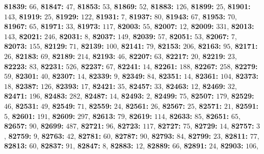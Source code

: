\textsf{\bfseries 81839:} $66$, \textsf{\bfseries 81847:} $47$, \textsf{\bfseries 81853:} $53$, \textsf{\bfseries 81869:} $52$, \textsf{\bfseries 81883:} $126$, \textsf{\bfseries 81899:} $25$, \textsf{\bfseries 81901:} $143$, \textsf{\bfseries 81919:} $25$, \textsf{\bfseries 81929:} $122$, \textsf{\bfseries 81931:} $7$, \textsf{\bfseries 81937:} $80$, \textsf{\bfseries 81943:} $67$, \textsf{\bfseries 81953:} $70$, \textsf{\bfseries 81967:} $65$, \textsf{\bfseries 81971:} $33$, \textsf{\bfseries 81973:} $117$, \textsf{\bfseries 82003:} $55$, \textsf{\bfseries 82007:} $12$, \textsf{\bfseries 82009:} $331$, \textsf{\bfseries 82013:} $143$, \textsf{\bfseries 82021:} $246$, \textsf{\bfseries 82031:} $8$, \textsf{\bfseries 82037:} $149$, \textsf{\bfseries 82039:} $57$, \textsf{\bfseries 82051:} $53$, \textsf{\bfseries 82067:} $7$, \textsf{\bfseries 82073:} $155$, \textsf{\bfseries 82129:} $71$, \textsf{\bfseries 82139:} $100$, \textsf{\bfseries 82141:} $79$, \textsf{\bfseries 82153:} $206$, \textsf{\bfseries 82163:} $95$, \textsf{\bfseries 82171:} $26$, \textsf{\bfseries 82183:} $69$, \textsf{\bfseries 82189:} $214$, \textsf{\bfseries 82193:} $46$, \textsf{\bfseries 82207:} $63$, \textsf{\bfseries 82217:} $20$, \textsf{\bfseries 82219:} $23$, \textsf{\bfseries 82223:} $83$, \textsf{\bfseries 82231:} $526$, \textsf{\bfseries 82237:} $67$, \textsf{\bfseries 82241:} $14$, \textsf{\bfseries 82261:} $188$, \textsf{\bfseries 82267:} $258$, \textsf{\bfseries 82279:} $59$, \textsf{\bfseries 82301:} $40$, \textsf{\bfseries 82307:} $14$, \textsf{\bfseries 82339:} $9$, \textsf{\bfseries 82349:} $84$, \textsf{\bfseries 82351:} $14$, \textsf{\bfseries 82361:} $104$, \textsf{\bfseries 82373:} $18$, \textsf{\bfseries 82387:} $126$, \textsf{\bfseries 82393:} $17$, \textsf{\bfseries 82421:} $35$, \textsf{\bfseries 82457:} $33$, \textsf{\bfseries 82463:} $12$, \textsf{\bfseries 82469:} $32$, \textsf{\bfseries 82471:} $196$, \textsf{\bfseries 82483:} $282$, \textsf{\bfseries 82487:} $14$, \textsf{\bfseries 82493:} $2$, \textsf{\bfseries 82499:} $75$, \textsf{\bfseries 82507:} $179$, \textsf{\bfseries 82529:} $46$, \textsf{\bfseries 82531:} $49$, \textsf{\bfseries 82549:} $71$, \textsf{\bfseries 82559:} $24$, \textsf{\bfseries 82561:} $26$, \textsf{\bfseries 82567:} $25$, \textsf{\bfseries 82571:} $21$, \textsf{\bfseries 82591:} $5$, \textsf{\bfseries 82601:} $191$, \textsf{\bfseries 82609:} $297$, \textsf{\bfseries 82613:} $79$, \textsf{\bfseries 82619:} $114$, \textsf{\bfseries 82633:} $85$, \textsf{\bfseries 82651:} $65$, \textsf{\bfseries 82657:} $90$, \textsf{\bfseries 82699:} $487$, \textsf{\bfseries 82721:} $96$, \textsf{\bfseries 82723:} $117$, \textsf{\bfseries 82727:} $75$, \textsf{\bfseries 82729:} $14$, \textsf{\bfseries 82757:} $3$, \textsf{\bfseries 82759:} $9$, \textsf{\bfseries 82763:} $42$, \textsf{\bfseries 82781:} $60$, \textsf{\bfseries 82787:} $90$, \textsf{\bfseries 82793:} $84$, \textsf{\bfseries 82799:} $23$, \textsf{\bfseries 82811:} $77$, \textsf{\bfseries 82813:} $60$, \textsf{\bfseries 82837:} $91$, \textsf{\bfseries 82847:} $8$, \textsf{\bfseries 82883:} $12$, \textsf{\bfseries 82889:} $66$, \textsf{\bfseries 82891:} $24$, \textsf{\bfseries 82903:} $106$, 
